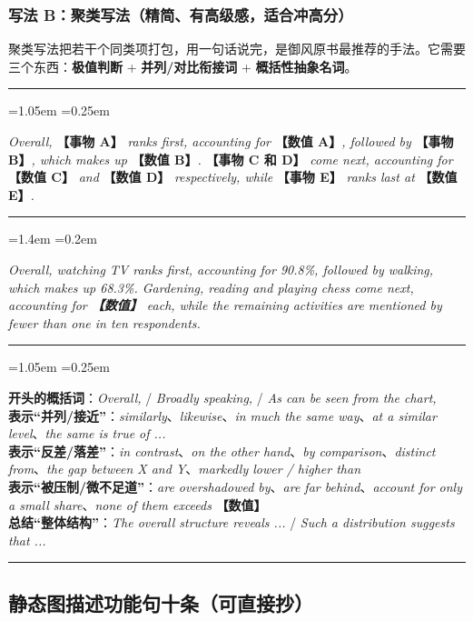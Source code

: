 \documentclass[11pt,a4paper]{ctexart}
\newcommand{\fillin}[1]{{\bfseries【#1】}}
\newcommand{\en}[1]{\textit{#1}}
\newenvironment{tpl}[1]{%
  \par\addvspace{7pt}\needspace{4\baselineskip}%
  \noindent{\bfseries\color{accent}#1}\par\nopagebreak
  \vspace{2pt}\noindent\rule{\linewidth}{0.7pt}\par\nopagebreak\vspace{3pt}%
  \begin{list}{}{\leftmargin=1.05em \rightmargin=0.25em \listparindent=0pt
    \itemindent=0pt \topsep=0pt \parsep=2.5pt \itemsep=2.5pt \partopsep=0pt}%
  \item\relax
}{%
  \end{list}\vspace{1pt}\noindent\rule{\linewidth}{0.7pt}\par\addvspace{8pt}%
}
\newenvironment{eg}{%
  \par\addvspace{4pt}%
  \begin{list}{}{\leftmargin=1.4em \rightmargin=0.2em \listparindent=0pt
    \itemindent=0pt \topsep=0pt \parsep=2pt \itemsep=2pt \partopsep=0pt}%
  \item\relax
}{%
  \end{list}\addvspace{5pt}%
}
\begin{document}
\subsubsection{写法 B：聚类写法（精简、有高级感，适合冲高分）}

聚类写法把若干个同类项打包，用一句话说完，是御风原书最推荐的手法。它需要三个东西：\textbf{极值判断} + \textbf{并列/对比衔接词} + \textbf{概括性抽象名词}。

\begin{tpl}{聚类写法公式}
\en{Overall,} \fillin{事物 A} \en{ranks first, accounting for} \fillin{数值 A}\en{, followed by} \fillin{事物 B}\en{, which makes up} \fillin{数值 B}\en{.} \fillin{事物 C 和 D} \en{come next, accounting for} \fillin{数值 C} \en{and} \fillin{数值 D} \en{respectively, while} \fillin{事物 E} \en{ranks last at} \fillin{数值 E}\en{.}
\end{tpl}

\begin{eg}
\en{Overall, watching TV ranks first, accounting for 90.8\%, followed by walking, which makes up 68.3\%. Gardening, reading and playing chess come next, accounting for \fillin{数值} each, while the remaining activities are mentioned by fewer than one in ten respondents.}
\end{eg}

\begin{tpl}{把聚类写法的两头写扎实}
\textbf{开头的概括词}：\en{Overall,} / \en{Broadly speaking,} / \en{As can be seen from the chart,}\\[3pt]
\textbf{表示“并列/接近”}：\en{similarly}、\en{likewise}、\en{in much the same way}、\en{at a similar level}、\en{the same is true of ...}\\[3pt]
\textbf{表示“反差/落差”}：\en{in contrast}、\en{on the other hand}、\en{by comparison}、\en{distinct from}、\en{the gap between X and Y}、\en{markedly lower / higher than}\\[3pt]
\textbf{表示“被压制/微不足道”}：\en{are overshadowed by}、\en{are far behind}、\en{account for only a small share}、\en{none of them exceeds} \fillin{数值}\\[3pt]
\textbf{总结“整体结构”}：\en{The overall structure reveals ...} / \en{Such a distribution suggests that ...}
\end{tpl}

\subsection{静态图描述功能句十条（可直接抄）}
\end{document}
